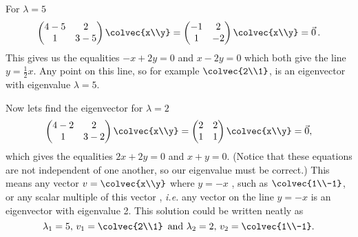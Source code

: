 {For $\lambda= 5$
\[
\begin{pmatrix}
4-5 & 2\\
1 & 3-5 \\ 
\end{pmatrix} \colvec{x\\y} =
\begin{pmatrix}
-1 & 2\\
1 & -2 \\ 
\end{pmatrix} \colvec{x\\y}
= \vec 0 \, .
\]
This gives us the equalities $-x +2y = 0$ and $x -2y = 0$ which both give the line $ y = \frac{1}{2}x$. Any point on this line, so for example $\colvec{2\\1}$, is an eigenvector with eigenvalue $\lambda = 5$.

Now lets find the eigenvector for $\lambda = 2$
\[
\begin{pmatrix}
4-2 & 2\\
1 & 3-2 \\ 
\end{pmatrix} \colvec{x\\y} =
\begin{pmatrix}
2 & 2\\
1 & 1 \\ 
\end{pmatrix} \colvec{x\\y}
= \vec 0 ,
\]
which gives the equalities $2x+2y = 0$ and $x+y = 0$. 
(Notice that these equations are not independent of one another, so our eigenvalue must be correct.)
This means any vector $v =  \colvec{x\\y}$ where $y = -x$ , such as $\colvec{1\\-1}$, or any scalar multiple of this vector , {\it i.e.} any vector on the line $y = -x$ is an eigenvector with eigenvalue 2. This solution could be written neatly as
 \[
\lambda_1 = 5, \, v_1= \colvec{2\\1} \, \text{ and } \lambda_2 = 2, \, v_2=\colvec{1\\-1}.
\]
} %

